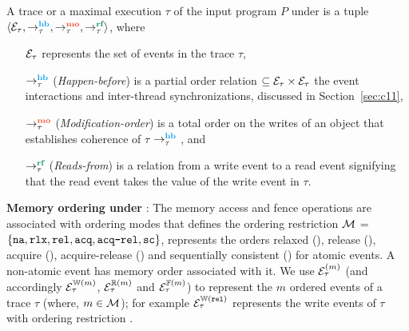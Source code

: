 \begin{definition}[Trace]\newline
{}
	A trace or a maximal execution $\tau$ of the input 
	program $P$ under \cc is a tuple 
	$\langle \events_\tau, \setHB, \setMO, \setRF \rangle$, where
	\begin{itemize}[label=sethb,align=left,leftmargin=*]
		\item [$\mathcal{E}_\tau$] represents the set of events in the trace $\tau$,
		\item [$\setHB$] ({\em Happen-before}) is a partial order relation
			$\subseteq \mathcal{E}_\tau \times \mathcal{E}_\tau$
                         the event interactions and inter-thread
			synchronizations, discussed in Section~\ref{sec:c11},
		\item [$\setMO$] ({\em Modification-order}) is a total order on the
			writes of an object that establishes coherence of $\tau$ 
			\wrt $\setHB$ , and
		\item [$\setRF$] ({\em Reads-from}) is a relation from a write event to
			a read event signifying that the read event takes the value of 
			the write event in $\tau$.
	\end{itemize}
\end{definition}

\noindent
{\bf Memory ordering under \cc}: 
The memory access and fence operations are
associated with ordering modes
that defines the ordering restriction 
%
$\mathcal{M}$ = $\{ \texttt{na}, \texttt{rlx}, \texttt{rel}, \texttt{acq}, \texttt{acq-rel}, \texttt{sc} \}$, 
represents the orders relaxed (\rlx), release (\rel), acquire (\acq),
acquire-release (\acqrel) and sequentially consistent (\sc) for
atomic events. A non-atomic event has \na memory order associated with 
it.
%
We use $\mathcal{E}^{(m)}_\tau$ (and accordingly $\mathcal{E}^{\mathbb{W}(m)}_\tau$, 
$\mathcal{E}^{\mathbb{R}(m)}_\tau$ and $\mathcal{E}^{\mathbb{F}(m)}_\tau$) to represent the $m$
ordered events of a trace $\tau$ (where, $m \in \mathcal{M}$);
for example $\mathcal{E}^{\mathbb{W}(\texttt{rel})}_\tau$ represents the write events of 
$\tau$ with ordering restriction \rel. 

